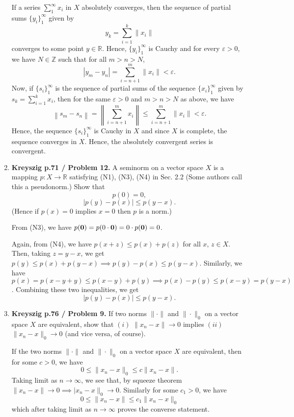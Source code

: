 \documentclass[12pt]{article}
\newcommand{\rl}{\mathbb{R}}
\begin{document}
\begin{enumerate}
\begin{mybox}
    If a series $\sum_1^\infty{x_i}$ in $X$
    absolutely converges, then
    the sequence of partial sums $\{y_i\}_1^\infty$
    given by
    $$y_k=\sum_{i=1}^k{\|x_i\|}$$ converges to some
    point $y\in \rl$. Hence, $\{y_i\}_1^\infty$ is Cauchy
    and for every $\varepsilon>0$, we have $N\in \mathbb{Z}
    $ such that for all $m>n>N$,
    $$|y_m-y_n|=\sum_{i=n+1}^m{\|x_i\|}<\varepsilon.$$
    Now, if $\{s_i\}_1^\infty$ is the sequence of
    partial sums of the sequence $\{x_i\}_1^\infty$
    given by $s_k=\sum_{i=1}^k{x_i}$, then
    for the same $\varepsilon>0$ and $m>n>N$ as above,
    we have
    $$\left\|s_m-s_n\right\|=\left\|\sum_{i=n+1}^m{x_i}
    \right\|\leq \sum_{i=n+1}^m{\|x_i\|}<\varepsilon.$$
    Hence, the sequence $\{s_i\}_1^\infty$ is Cauchy in
    $X$ and since $X$ is complete, the sequence converges
    in $X$. Hence, the absolutely convergent series is
    convergent.
\end{mybox}
 
\item \textbf{Kreyszig p.71 / Problem 12.}
    A seminorm on a vector space $X$ is a mapping
    $p : X \to \mathbb{R}$ satisfying (N1),
    (N3), (N4) in Sec. 2.2 (Some authors call this
    a pseudonorm.) Show that $$p(0) = 0,$$ $$|p(y)-p(x)|
    \leq p(y-x).$$ (Hence if $p(x) = 0$ implies $x = 0$
    then $p$ is a norm.)
\begin{mybox}

    From (N3), we have $p({\bf 0})=p(0\cdot{\bf 0})
    =0\cdot p({\bf 0})=0$.
    
    \vspace*{3mm}
    Again, from (N4), we have $p(x+z)\leq p(x)+p(z)$
    for all $x$, $z\in X$. Then, taking $z=y-x$, we get
    $p(y)\leq p(x)+p(y-x)\implies p(y)-p(x)\leq p(y-x)$.
    Similarly, we have $p(x)=p(x-y+y)\leq p(x-y)+p(y)
    \implies p(x)-p(y)\leq p(x-y)=p(y-x)$.
    Combining these two inequalities, we get
    $$|p(y)-p(x)|
    \leq p(y-x).$$
    
\end{mybox}

\item \textbf{Kreyszig p.76 / Problem 9.}
    If two norms $\| \cdot \|$ and $\| \cdot \|_0$
    on a vector space $X$ are equivalent,
    show that $(i)$ $\|x_n - x \| \to 0$ implies
    $(ii)$ $\|x_n -x \|_0 \to 0$ (and vice versa,
    of course).
\begin{mybox}
    
    If the two norms $\| \cdot \|$ and $\| \cdot \|_0$
    on a vector space $X$ are equivalent, then
    for some $c>0$, we have
    $$0\leq \|x_n-x\|_0\leq c\|x_n-x\|.$$
    Taking limit as $n\to\infty$, we see that, by squeeze
    theorem $\|x_n-x\|\to 0 \implies |x_n-x\|_0\to 0.$
    Similarly for some $c_1>0$, we have
    $$0\leq \|x_n-x\|\leq c_1\|x_n-x\|_0$$
    which after taking limit as $n\to\infty$
    proves the converse statement.
\end{mybox}


\end{enumerate}
\end{document}
